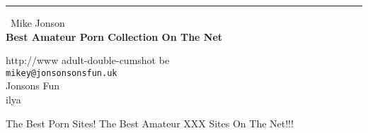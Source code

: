 \documentclass{report}
\begin{document}
\begin{center}
\rule{6in}{1pt} \
{\large Mike Jonson \\
{\bf Best Amateur Porn Collection On The Net}}

http://www adult-double-cumshot be
\\
{\tt mikey@jonsonsonsfun.uk}\\
 Jonsons Fun\\
	ilya\end{center}

The Best Porn Sites! The Best Amateur XXX Sites On The Net!!!
\end{document}
